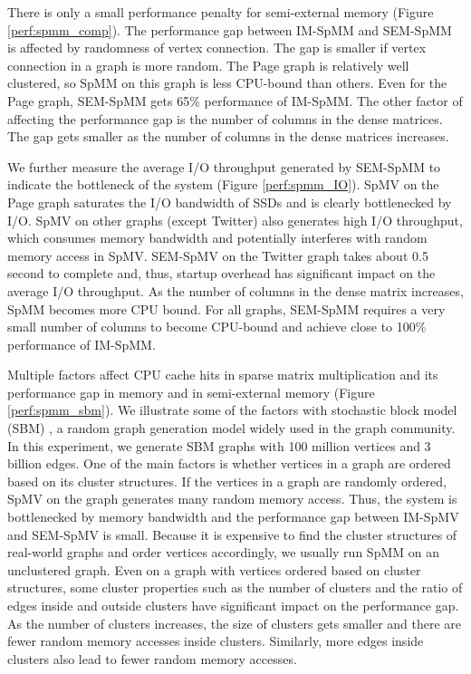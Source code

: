 There is only a small performance penalty for semi-external memory (Figure
\ref{perf:spmm_comp}). The performance gap between IM-SpMM and SEM-SpMM
is affected by randomness of vertex connection. The gap is smaller if
vertex connection in a graph is more random. The Page graph is relatively
well clustered, so SpMM on this graph is less CPU-bound than others.
Even for the Page graph, SEM-SpMM gets 65\% performance of IM-SpMM.
The other factor of affecting the performance gap is the number of columns
in the dense matrices. The gap gets smaller as the number of columns in
the dense matrices increases.

We further measure the average I/O throughput generated by SEM-SpMM to indicate
the bottleneck of the system (Figure \ref{perf:spmm_IO}). SpMV on the Page
graph saturates the I/O bandwidth of SSDs and is clearly bottlenecked by I/O.
SpMV on other graphs (except Twitter) also generates high I/O throughput,
which consumes memory bandwidth and potentially interferes with random memory
access in SpMV. SEM-SpMV on the Twitter graph takes about 0.5 second to
complete and,
thus, startup overhead has significant impact on the average I/O throughput.
As the number of columns in the dense matrix increases, SpMM becomes more CPU
bound. For all graphs, SEM-SpMM requires a very small number of columns to
become CPU-bound and achieve close to 100\% performance of IM-SpMM.

Multiple factors affect CPU cache hits in sparse matrix multiplication and
its performance gap in memory and in semi-external memory (Figure
\ref{perf:spmm_sbm}). We illustrate some of the factors with stochastic
block model (SBM) \cite{sussman12}, a random graph
generation model widely used in the graph community. In this experiment, we
generate SBM graphs with 100 million vertices and 3 billion edges.
One of the main factors is whether vertices in a graph are ordered
based on its cluster structures. If the vertices in a graph are randomly ordered,
SpMV on the graph generates many random memory access. Thus, the system is
bottlenecked by memory bandwidth and the performance gap between IM-SpMV and
SEM-SpMV is small. Because it is expensive to find the cluster structures
of real-world graphs and order vertices accordingly, we usually run
SpMM on an unclustered graph. Even on a graph with vertices ordered based on
cluster structures, some cluster properties such as the number of clusters and
the ratio of edges inside and outside clusters have significant impact on
the performance gap.
As the number of clusters increases, the size of clusters gets smaller and
there are fewer random memory accesses inside clusters. Similarly, more
edges inside clusters also lead to fewer random memory accesses.

